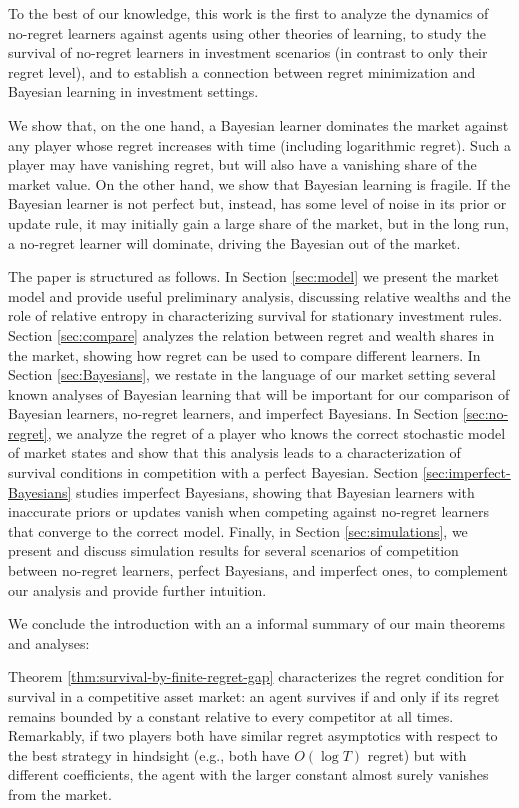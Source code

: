 
To the best of our knowledge, this work is the first to analyze the dynamics of no-regret learners against agents using other theories of learning, to study the survival of no-regret learners in investment scenarios (in contrast to only their regret level), and to establish a connection between regret minimization and Bayesian learning in investment settings.

We show that, on the one hand, a Bayesian learner dominates the market against any player whose regret increases with time (including logarithmic regret). Such a player may have vanishing regret, but will also have a vanishing share of the market value. On the other hand, we show that Bayesian learning is fragile. If the Bayesian learner is not perfect but, instead, has some level of noise in its prior or update rule, it may initially gain a large share of the market, but in the long run, a no-regret learner will dominate, driving the Bayesian out of the market.

The paper is structured as follows. In Section \ref{sec:model} we present the market model and provide useful preliminary analysis, discussing relative wealths and the role of relative entropy in characterizing survival for stationary investment rules.  
Section \ref{sec:compare} analyzes the relation between regret and wealth shares in the market, showing how regret can be used to compare different learners.  
In Section \ref{sec:Bayesians}, we restate in the language of our market setting several known analyses of Bayesian learning that will be important for our comparison of Bayesian learners, no-regret learners, and imperfect Bayesians.  
In Section \ref{sec:no-regret}, we analyze the regret of a player who knows the correct stochastic model of market states and show that this analysis leads to a characterization of survival conditions in competition with a perfect Bayesian.  
Section \ref{sec:imperfect-Bayesians} studies imperfect Bayesians, showing that Bayesian learners with inaccurate priors or updates vanish when competing against no-regret learners that converge to the correct model. 
Finally, in Section \ref{sec:simulations}, we present and discuss simulation results for several scenarios of competition between no-regret learners, perfect Bayesians, and imperfect ones, to complement our analysis and provide further intuition.  

We conclude the introduction with an a informal summary of our main theorems and analyses:

Theorem \ref{thm:survival-by-finite-regret-gap} characterizes the regret condition for survival in a competitive asset market: an agent survives if and only if its regret remains bounded by a constant relative to every competitor at all times.  
Remarkably, if two players both have similar regret asymptotics with respect to the best strategy in hindsight (e.g., both have $O(\log T)$ regret) but with different coefficients, the agent with the larger constant almost surely vanishes from the market.  

